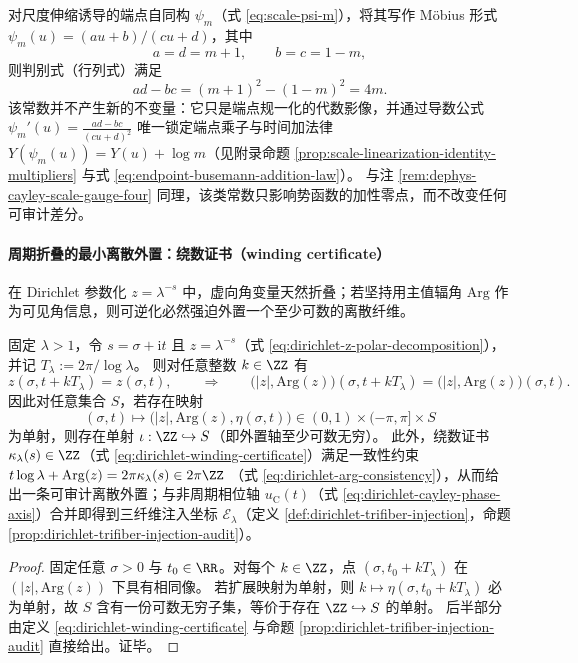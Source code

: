 \begin{remark}\label{rem:dephys-psi-discriminant-locks-time}
对尺度伸缩诱导的端点自同构 \(\psi_m\)（式 \eqref{eq:scale-psi-m}），将其写作 Möbius 形式 \(\psi_m(u)=(au+b)/(cu+d)\)，其中
\[
a=d=m+1,\qquad b=c=1-m,
\]
则判别式（行列式）满足
\[
\boxed{\;ad-bc=(m+1)^2-(1-m)^2=4m.\;}
\]
该常数并不产生新的不变量：它只是端点规一化的代数影像，并通过导数公式
\(
\psi_m'(u)=\frac{ad-bc}{(cu+d)^2}
\)
唯一锁定端点乘子与时间加法律 \(Y(\psi_m(u))=Y(u)+\log m\)（见附录命题 \ref{prop:scale-linearization-identity-multipliers} 与式 \eqref{eq:endpoint-busemann-addition-law}）。
与注 \ref{rem:dephys-cayley-scale-gauge-four} 同理，该类常数只影响势函数的加性零点，而不改变任何可审计差分。
\end{remark}

\paragraph{周期折叠的最小离散外置：绕数证书（winding certificate）}
在 Dirichlet 参数化 \(z=\lambda^{-s}\) 中，虚向角变量天然折叠；若坚持用主值辐角 \(\mathrm{Arg}\) 作为可见角信息，则可逆化必然强迫外置一个至少可数的离散纤维。

\begin{theorem}\label{thm:dephys-dirichlet-winding-minimal}
固定 \(\lambda>1\)，令 \(s=\sigma+\mathrm{i}t\) 且 \(z=\lambda^{-s}\)（式 \eqref{eq:dirichlet-z-polar-decomposition}），并记 \(T_{\lambda}:=2\pi/\log\lambda\)。
则对任意整数 \(k\in\ZZ\) 有
\[
z(\sigma,t+kT_{\lambda})=z(\sigma,t),
\qquad\Longrightarrow\qquad
\bigl(|z|,\mathrm{Arg}(z)\bigr)(\sigma,t+kT_{\lambda})=\bigl(|z|,\mathrm{Arg}(z)\bigr)(\sigma,t).
\]
因此对任意集合 \(S\)，若存在映射
\[
(\sigma,t)\longmapsto \bigl(|z|,\mathrm{Arg}(z),\eta(\sigma,t)\bigr)\in (0,1)\times(-\pi,\pi]\times S
\]
为单射，则存在单射 \(\iota:\ZZ\hookrightarrow S\)（即外置轴至少可数无穷）。
此外，绕数证书 \(\kappa_{\lambda}(s)\in\ZZ\)（式 \eqref{eq:dirichlet-winding-certificate}）满足一致性约束
\(
t\log\lambda+\mathrm{Arg}(z)=2\pi\kappa_{\lambda}(s)\in 2\pi\ZZ
\)
（式 \eqref{eq:dirichlet-arg-consistency}），从而给出一条可审计离散外置；与非周期相位轴 \(u_{\mathrm C}(t)\)（式 \eqref{eq:dirichlet-cayley-phase-axis}）合并即得到三纤维注入坐标 \(\mathcal{E}_{\lambda}\)（定义 \ref{def:dirichlet-trifiber-injection}，命题 \ref{prop:dirichlet-trifiber-injection-audit}）。
\end{theorem}

\begin{proof}
固定任意 \(\sigma>0\) 与 \(t_0\in\RR\)。对每个 \(k\in\ZZ\)，点 \((\sigma,t_0+kT_{\lambda})\) 在 \((|z|,\mathrm{Arg}(z))\) 下具有相同像。
若扩展映射为单射，则 \(k\mapsto \eta(\sigma,t_0+kT_{\lambda})\) 必为单射，故 \(S\) 含有一份可数无穷子集，等价于存在 \(\ZZ\hookrightarrow S\) 的单射。
后半部分由定义 \eqref{eq:dirichlet-winding-certificate} 与命题 \ref{prop:dirichlet-trifiber-injection-audit} 直接给出。证毕。
\end{proof}

